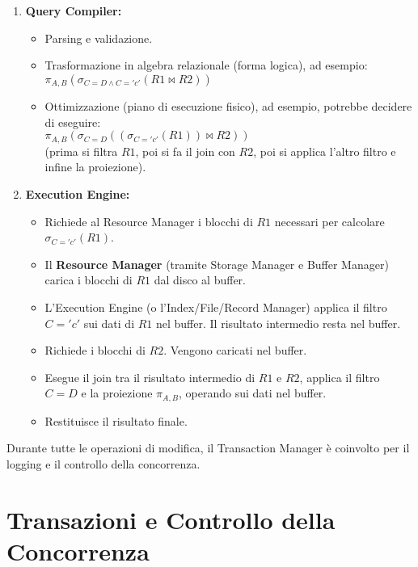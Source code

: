\begin{enumerate}
    \item \textbf{Query Compiler:}
    \begin{itemize}
        \item Parsing e validazione.
        \item Trasformazione in algebra relazionale (forma logica), ad esempio:\\
        $\pi_{A,B} ( \sigma_{C=D \land C='c'} (R1 \bowtie R2) )$
        \item Ottimizzazione (piano di esecuzione fisico), ad esempio, potrebbe decidere di eseguire:\\
        $\pi_{A,B}(\sigma_{C=D}( (\sigma_{C='c'}(R1)) \bowtie R2 ))$\\
        (prima si filtra $R1$, poi si fa il join con $R2$, poi si applica l'altro filtro e infine la proiezione).
    \end{itemize}
    
    \item \textbf{Execution Engine:}
    \begin{itemize}
        \item Richiede al Resource Manager i blocchi di $R1$ necessari per calcolare $\sigma_{C='c'}(R1)$.
        \item Il \textbf{Resource Manager} (tramite Storage Manager e Buffer Manager) carica i blocchi di $R1$ dal disco al buffer.
        \item L'Execution Engine (o l'Index/File/Record Manager) applica il filtro $C='c'$ sui dati di $R1$ nel buffer. Il risultato intermedio resta nel buffer.
        \item Richiede i blocchi di $R2$. Vengono caricati nel buffer.
        \item Esegue il join tra il risultato intermedio di $R1$ e $R2$, applica il filtro $C=D$ e la proiezione $\pi_{A,B}$, operando sui dati nel buffer.
        \item Restituisce il risultato finale.
    \end{itemize}
\end{enumerate}
Durante tutte le operazioni di modifica, il Transaction Manager è coinvolto per il logging e il controllo della concorrenza.

\section{Transazioni e Controllo della Concorrenza}

